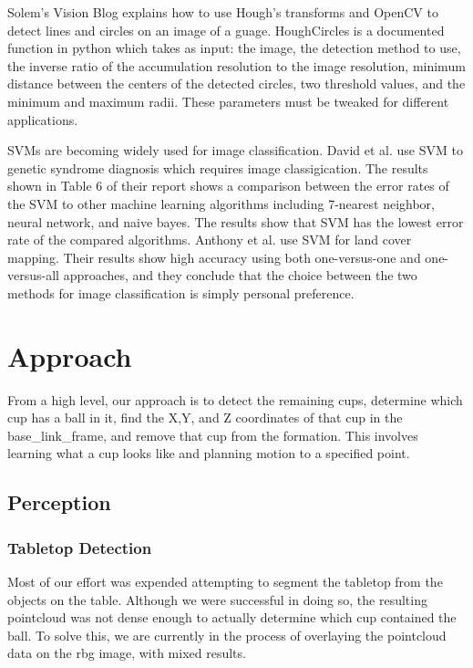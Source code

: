 \documentclass[letterpaper, 10 pt, conference]{ieeeconf}  %
\begin{document}
Solem’s Vision Blog explains how to use Hough’s transforms and OpenCV to detect lines and circles on an image of a guage. HoughCircles is a documented function in python which takes as input: the image, the detection method to use, the inverse ratio of the accumulation resolution to the image resolution, minimum distance between the centers of the detected circles, two threshold values, and the minimum and maximum radii. These parameters must be tweaked for different applications.

SVMs are becoming widely used for image classification. David et al. use SVM to genetic syndrome diagnosis which requires image classigication. The results shown in Table 6 of their report shows a comparison between the error rates of the SVM to other machine learning algorithms including 7-nearest neighbor, neural network, and naive bayes. The results show that SVM has the lowest error rate of the compared algorithms. Anthony et al. use SVM for land cover mapping. Their results show high accuracy using both one-versus-one and one-versus-all approaches, and they conclude that the choice between the two methods for image classification is simply personal preference.

\section{Approach}

From a high level, our approach is to detect the remaining cups, determine which cup has a ball in it, find the X,Y, and Z coordinates of that cup in the base\_link\_frame, and remove that cup from the formation.  This involves learning what a cup looks like and planning motion to a specified point.

\subsection{Perception}



\subsubsection{Tabletop Detection}

Most of our effort was expended attempting to segment the tabletop from the objects on the table.  Although we were successful in doing so, the resulting pointcloud was not dense enough to actually determine which cup contained the ball.  To solve this, we are currently in the process of overlaying the pointcloud data on the rbg image, with mixed results.
\end{document}
